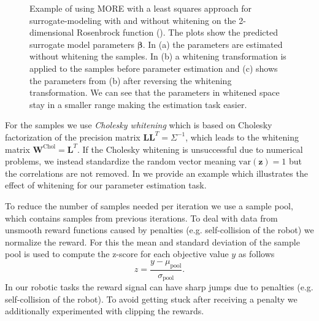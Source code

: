\begin{figure}[t]
  \centering
  \caption{\small
    Example of using MORE with a least squares approach for
    surrogate-modeling with and without whitening on the 2-dimensional
    Rosenbrock function ().
    The plots show the predicted surrogate model
    parameters $\mathbf{\beta}$. In (a) the parameters are estimated
    without whitening the samples. In (b) a whitening transformation is
    applied to the samples before parameter estimation
    and (c) shows the parameters from (b) after reversing
    the whitening transformation.
    We can see that the parameters in whitened space
    stay in a smaller range 
    making the estimation task easier.}
 \label{fig:whitening}
\end{figure}

For the samples we use \textit{Cholesky whitening} which is based on
Cholesky factorization of the precision matrix
$\mathbf{L}\mathbf{L}^T = \Sigma^{-1}$, which leads to the whitening
matrix $\mathbf{W}^{\text{Chol}} = \mathbf{L}^T$.
If the Cholesky whitening is unsuccessful due to numerical problems,
we instead standardize
the random vector meaning $\text{var}(\mathbf{z}) = 1$ but the correlations
are not removed.
In  we provide an example which illustrates the effect of 
whitening for our parameter estimation task.

To reduce the number of samples needed per iteration we use a sample
pool, which contains samples from previous iterations.
To deal with data from unsmooth reward functions
caused by penalties (e.g. self-collision of the robot) we
normalize the reward.
For this the mean and standard deviation of the sample pool is used to compute
the z-score for each objective value $y$ as follows
\begin{equation*}
  \label{eq:norm}
  z = \frac{y - \mu_{\text{pool}}}{\sigma_{\text{pool}}}.
\end{equation*}
In our robotic tasks the reward signal can have sharp jumps due to
penalties (e.g. self-collision of the robot).
To avoid getting stuck after receiving a penalty we additionally
experimented with clipping the rewards.

